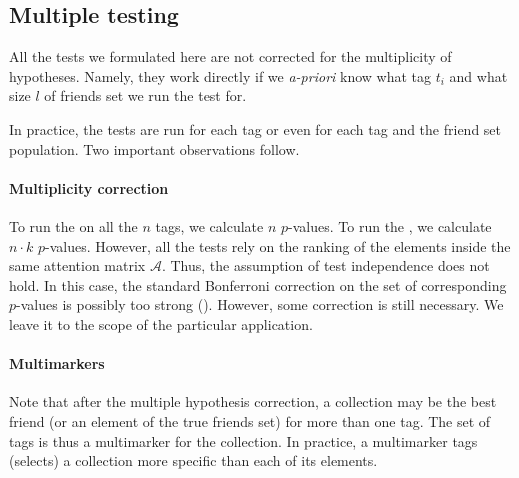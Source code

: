 \documentclass{llncs}
\begin{document}



\subsection{Multiple testing}
\label{sec:multimurkers}

All the tests we formulated here are not corrected for the multiplicity of hypotheses. Namely, they work directly if we \textit{a-priori} know what tag $t_i$ and what size $l$ of friends set we run the test for. 

In practice, the tests are run for each tag or even for each tag and the friend set population. Two important observations follow.

\paragraph*{Multiplicity correction} 
To run the  on all the $n$ tags, we 
calculate $n$ $p$-values. To run the , we calculate $n \cdot k$ $p$-values. However, all the tests rely on the ranking of the elements inside the same attention matrix $\mathcal{A}$. Thus, the assumption of test independence does not hold. In this case, the standard Bonferroni correction on the set of corresponding $p$-values is possibly too strong (\cite{cabin2000bonferroni}). However, some correction is still necessary. We leave it to the scope of the particular application.

\paragraph*{Multimarkers} Note that after the multiple hypothesis correction, a collection may be the best friend (or an element of the true friends set) for more than one tag. The set of tags is thus a multimarker for the collection. In practice, a multimarker tags (selects) a collection more specific than each of its elements.
\end{document}
